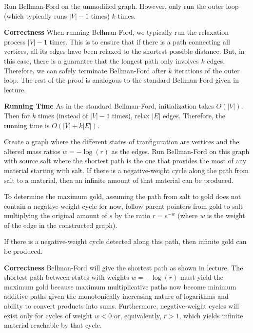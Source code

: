 \documentclass[12pt,twoside]{article}
\begin{document}
\begin{problems}
\begin{problemparts}
\end{problemparts}

\newpage

 Run Bellman-Ford on the unmodified graph. However,
only run the outer loop (which typically runs $|V| - 1$ times) $k$ times.

{\bf Correctness} When running Bellman-Ford, we typically run the relaxation
process $|V| - 1$ times. This is to ensure that if there is a path connecting all
vertices, all its edges have been relaxed to the shortest possible distance.
But, in this case, there is a guarantee that the longest path only involves
$k$ edges. Therefore, we can safely terminate Bellman-Ford after $k$
iterations of the outer loop. The rest of the proof is analogous to the
standard Bellman-Ford given in lecture.

{\bf Running Time} As in the standard Bellman-Ford, initialization takes
$O(|V|)$. Then for $k$ times (instead of $|V| - 1$ times), relax $|E|$ edges.
Therefore, the running time is $O(|V| + k|E|)$.

 Create a graph where the different states of
tranfiguration are vertices and the altered mass ratios $w = -\log(r)$ as the
edges. Run Bellman-Ford on this graph with source salt where the shortest
path is the one that provides the most of any material starting with salt. If
there is a negative-weight cycle along the path from salt to a material, then
an infinite amount of that material can be produced.

To determine the maximum gold, assuming the path from salt to gold does not
contain a negative-weight cycle for now, follow parent pointers from gold to
salt multiplying the original amount of $s$ by the ratio $r = e^{-w}$
(where $w$ is the weight of the edge in the constructed graph).

If there is a negative-weight cycle detected along this path, then infinite
gold can be produced.

{\bf Correctness} Bellman-Ford will give the shortest path as shown in
lecture. The shortest path between states with weights $w = -\log(r)$ must
yield the maximum gold because maximum multiplicative paths now become
minimum additive paths given the monotonically increasing nature of
logarithms and ability to convert products into sums. Furthermore,
negative-weight cycles will exist only for cycles of weight $w < 0$ or,
equivalently, $r > 1$, which yields infinite material reachable by that
cycle.


\end{problems}
\end{document}
